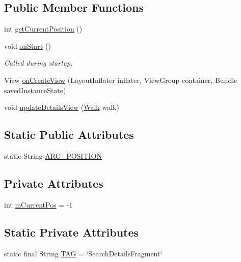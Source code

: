 \subsection*{Public Member Functions}
\begin{DoxyCompactItemize}
\item 
int \hyperlink{classuk_1_1ac_1_1swan_1_1digitaltrails_1_1fragments_1_1_search_details_fragment_a7f81c253227eb5a8623fd1e5698d572b}{get\+Current\+Position} ()
\item 
void \hyperlink{classuk_1_1ac_1_1swan_1_1digitaltrails_1_1fragments_1_1_search_details_fragment_aac5c7e87af3303c241d5a8d45eafcc43}{on\+Start} ()
\begin{DoxyCompactList}\small\item\em Called during startup. \end{DoxyCompactList}\item 
View \hyperlink{classuk_1_1ac_1_1swan_1_1digitaltrails_1_1fragments_1_1_search_details_fragment_af50a3e34ab40b874152851e40df2996b}{on\+Create\+View} (Layout\+Inflater inflater, View\+Group container, Bundle saved\+Instance\+State)
\item 
void \hyperlink{classuk_1_1ac_1_1swan_1_1digitaltrails_1_1fragments_1_1_search_details_fragment_a30a52dee58e0523db1319bd1b5dfdc77}{update\+Details\+View} (\hyperlink{classuk_1_1ac_1_1swan_1_1digitaltrails_1_1components_1_1_walk}{Walk} walk)
\end{DoxyCompactItemize}
\subsection*{Static Public Attributes}
\begin{DoxyCompactItemize}
\item 
static String \hyperlink{classuk_1_1ac_1_1swan_1_1digitaltrails_1_1fragments_1_1_search_details_fragment_aad25040ec92e3ffc5c69918cfa23a20b}{A\+R\+G\+\_\+\+P\+O\+S\+I\+T\+I\+O\+N}
\end{DoxyCompactItemize}
\subsection*{Private Attributes}
\begin{DoxyCompactItemize}
\item 
int \hyperlink{classuk_1_1ac_1_1swan_1_1digitaltrails_1_1fragments_1_1_search_details_fragment_a16065bb282f9f9d09aac680ca319a957}{m\+Current\+Pos} = -\/1
\end{DoxyCompactItemize}
\subsection*{Static Private Attributes}
\begin{DoxyCompactItemize}
\item 
static final String \hyperlink{classuk_1_1ac_1_1swan_1_1digitaltrails_1_1fragments_1_1_search_details_fragment_a0ec83a6f3697db1d9df087a58e81ee34}{T\+A\+G} = \char`\"{}Search\+Details\+Fragment\char`\"{}
\end{DoxyCompactItemize}
